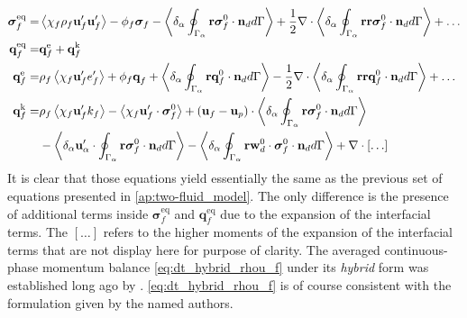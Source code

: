 \begin{align}
    \label{eq:sigma_eq_def}
    \bm{\sigma}_f^\text{eq}
    =& 
    \avg{\chi_f\rho_f\textbf{u}_f'\textbf{u}_f'}
    - \phi_f \bm{\sigma}_f%
    - \pSavg{{\textbf{r}\bm{\sigma}_f^0 \cdot \textbf{n}_d}}
    +\frac{1}{2}\div \pSavg{{\textbf{rr}\bm{\sigma}_f^0 \cdot \textbf{n}_d}}
    + \ldots
    \\
    \textbf{q}_f^\text{eq}
    =&\textbf{q}_f^\text{e} +\textbf{q}_f^\text{k}  \nonumber\\
    \textbf{q}_f^\text{e}
    =& \rho_f \avg{\chi_f \textbf{u}_f' e_f'} 
    + \phi_f\textbf{q}_f 
    +\pSavg{{\textbf{r}\textbf{q}_f^0 \cdot \textbf{n}_d}} 
    -\frac{1}{2}\div \pSavg{{\textbf{rr}\textbf{q}_f^0 \cdot \textbf{n}_d}} 
    + \ldots
    \nonumber\\
    \textbf{q}_f^\text{k}
    =& \rho_f \avg{\chi_f \textbf{u}_f' k_f} 
    - \avg{\chi_f \textbf{u}_f' \cdot \bm{\sigma}_f^0}
    + (\textbf{u}_f - \textbf{u}_p)\cdot
    \pSavg{{\textbf{r}\bm{\sigma}_f^0 \cdot \textbf{n}_d}}
    \nonumber\\\nonumber&
    - \pavg{ \textbf{u}_\alpha' \cdot \intS{ \textbf{r} \bm{\sigma}_f^0 \cdot \textbf{n}_d}}
    - \pavg{ \intS{\textbf{r}\textbf{w}_d^0 \cdot \bm{\sigma}_f^0 \cdot \textbf{n}_d}}
    + \div[\ldots]
\end{align}
It is clear that those equations yield essentially the same as the previous set of equations presented in \ref{ap:two-fluid_model}.
The only difference is the presence of additional terms inside $\bm{\sigma}^\text{eq}_f$ and $\textbf{q}^\text{eq}_f$ due to the expansion of the interfacial terms. 
The $[\ldots]$ refers to the higher moments of the expansion of the interfacial terms that are not display here for purpose of clarity. 
The averaged continuous-phase momentum balance \eqref{eq:dt_hybrid_rhou_f} under its \textit{hybrid} form was established long ago by \citet{zhang1997momentum,jackson1997locally}.  
\ref{eq:dt_hybrid_rhou_f} is of course consistent with the formulation given by the named authors.

